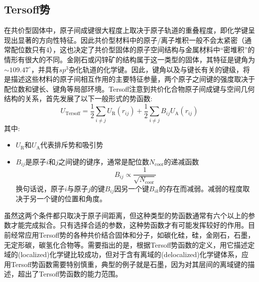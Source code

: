 \subsection{\rm{Tersoff}势}
在共价型固体中，原子间成键很大程度上取决于原子轨道的重叠程度，即化学键呈现出显著的方向性特征。因此共价型材料中的原子/离子堆积一般不会太紧密（通常配位数只有4），这也决定了共价型固体的原子空间结构与金属材料中“密堆积”的情形有很大的不同。金刚石或闪锌矿的结构属于这一类型的固体，其特征是键角为$\sim109.47^{\circ}$，并具有$sp^3$杂化轨道的化学键。因此，键角以及与键长有关的键级，将是描述这些材料的原子间相互作用的主要特征参量，两个原子之间键的强度取决于配位数和键长、键角等局部环境。\textrm{Tersoff}\cite{PRB37-6991_1988}注意到共价化合物原子间成键与空间几何结构的关系，首先发展了以下一般形式的势函数:~
\begin{equation}
	U_{\mathrm{Tersoff}}=\dfrac12\sum_{i\neq j}U_{\mathrm R}(r_{ij})+\dfrac12\sum_{i\neq j}B_{ij}U_{\mathrm A}(r_{ij})
	\label{eq:Potential_Tersoff}
\end{equation}
其中:
\begin{itemize}
	\item $U_{\mathrm R}$和$U_{\mathrm A}$代表排斥势和吸引势
	\item $B_{ij}$是原子$i$和$j$之间键的键序，通常是配位数$N_{\mathrm{coor}}$的递减函数
		\begin{displaymath}
			B_{ij}\propto\dfrac1{\sqrt{N_{\mathrm{coor}}}}
		\end{displaymath}
换句话说，原子$i$与原子$j$的键$B_{ij}$因另一个键$B_{ik}$的存在而减弱。减弱的程度取决于另一个键的位置和角度。
\end{itemize}
虽然这两个条件都只取决于原子间距离，但这种类型的势函数通常有六个以上的参数才能完成拟合。只有选择合适的参数，这种势函数才有可能发挥较好的作用。目前经常应用\textrm{Tersoff}势的各种共价结合固体和分子，如碳化硅，硅，金刚石，石墨，无定形碳，碳氢化合物等。需要指出的是，根据\textrm{Tersoff}势函数的定义，用它描述定域的\textrm{(localized)}化学键比较成功，但对于含有离域的\textrm{(delocalized)}化学键体系，应用\textrm{Tersoff}势函数需要特别慎重，典型的例子就是石墨，因为对其层间的离域键的描述，超出了\textrm{Tersoff}势函数的能力范围。

